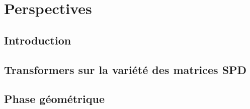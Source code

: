 \chapter{Perspectives}
\label{ch:perspectives}


\section{Introduction}
\label{sec:perspectives-introduction}


\section{Transformers sur la variété des matrices SPD}
\label{sec:perspectives-transformers}

%

\section{Phase géométrique}
\label{sec:perspectives-phase}

%

